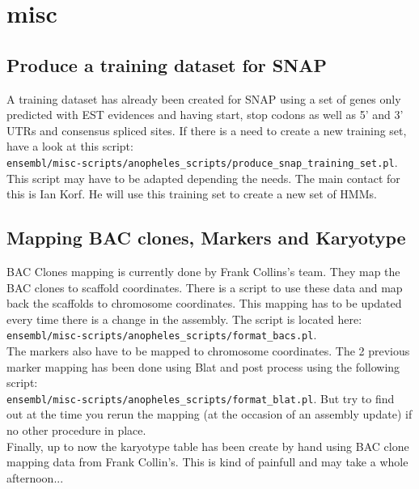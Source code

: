 \documentclass[a4paper,10pt]{article}
\begin{document}
\section{misc}
\subsection{Produce a training dataset for SNAP}
A training dataset has already been created for SNAP using a set of genes only predicted with EST evidences and having start, stop codons as well as 5' and 3' UTRs and consensus spliced sites. If there is a need to create a new training set, have a look at this script:\\
 \texttt{ensembl/misc-scripts/anopheles\_scripts/produce\_snap\_training\_set.pl}. This script may have to be adapted depending the needs.
The main contact for this is Ian Korf. He will use this training set to create a new set of HMMs.

\subsection{Mapping BAC clones, Markers and Karyotype}
BAC Clones mapping is currently done by Frank Collins's team. They map the BAC clones to scaffold coordinates. There is a script to use these data and map back the scaffolds to chromosome coordinates. This mapping has to be updated every time there is a change in the assembly. The script is located here:\\
 \texttt{ensembl/misc-scripts/anopheles\_scripts/format\_bacs.pl}.\\
The markers also have to be mapped to chromosome coordinates. The 2 previous marker mapping has been done using Blat and post process using the following script: \\
\texttt{ensembl/misc-scripts/anopheles\_scripts/format\_blat.pl}. But try to find out at the time you rerun the mapping (at the occasion of an assembly update) if no other procedure in place.\\
Finally, up to now the karyotype table has been create by hand using BAC clone mapping data from Frank Collin's. This is kind of painfull and may take a whole afternoon...
\end{document}
